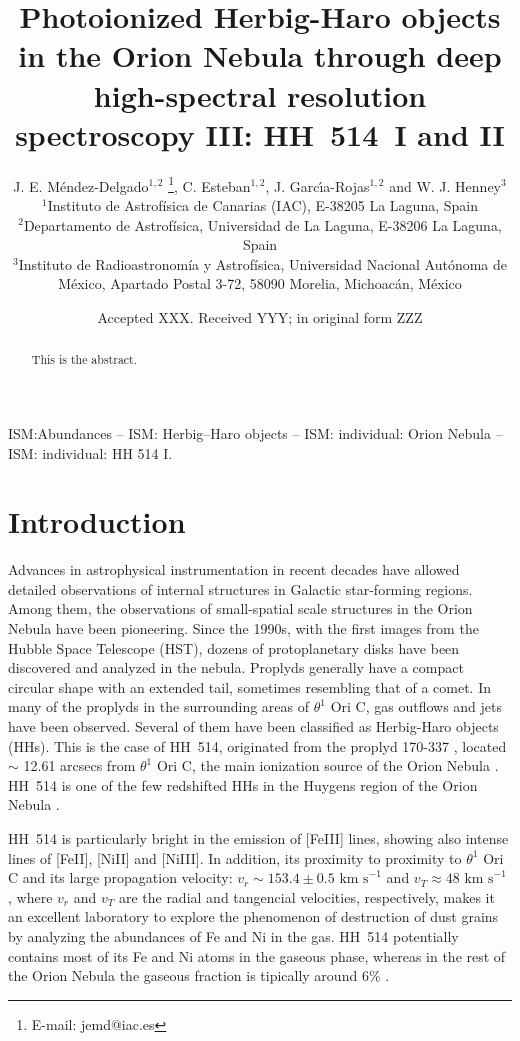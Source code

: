 \documentclass[fleqn,usenatbib]{mnras}
\title[HH~514~I and II in the Orion Nebula]{Photoionized Herbig-Haro objects in the Orion Nebula through deep high-spectral resolution spectroscopy III: HH~514~I and II}
\author[J. E. M\'endez-Delgado et al.]
{J. E. M\'endez-Delgado$^{1,2}$ \thanks{E-mail: jemd@iac.es},
C. Esteban$^{1,2}$, J. Garc{\'{\i}}a-Rojas$^{1,2}$ and W. J. Henney$^{3}$  
\\
$^{1}$Instituto de Astrof\'isica de Canarias (IAC), E-38205 La Laguna, Spain\\
$^{2}$Departamento de Astrof\'isica, Universidad de La Laguna, E-38206 La Laguna, Spain\\
$^{3}$Instituto de Radioastronom\'ia y Astrof\'isica, Universidad Nacional Aut\'onoma de M\'exico, Apartado Postal 3-72, 58090 Morelia, Michoac\'an, M\'exico}
\date{Accepted XXX. Received YYY; in original form ZZZ}
\begin{document}
\label{firstpage}
\pagerange{\pageref{firstpage}--\pageref{lastpage}}
\maketitle

\begin{abstract}
This is the abstract. 
\end{abstract}

\begin{keywords}
ISM:Abundances – ISM: Herbig–Haro objects – ISM: individual:
Orion Nebula – ISM: individual: HH 514 I.
\end{keywords}



\section{Introduction}
\label{sec:introduction}

Advances in astrophysical instrumentation in recent decades have allowed detailed observations of internal structures in Galactic star-forming regions. Among them, the observations of small-spatial scale structures in the Orion Nebula have been pioneering. Since the 1990s, with the first images from the Hubble Space Telescope (HST), dozens of protoplanetary disks \citep[proplyds,][]{Odell1993} have been discovered and analyzed in the nebula. Proplyds generally have a compact circular shape with an extended tail, sometimes resembling that of a comet. In many of the proplyds in the surrounding areas of $\theta^1$ Ori C, gas outflows and jets have been observed. Several of them have been classified as Herbig-Haro objects (HHs). This is the case of HH~514, originated from the proplyd 170-337 \citep[][]{bally00}, located $\sim$ 12.61 arcsecs from $\theta^1$ Ori C, the main ionization source of the Orion Nebula \citep[][]{ODell2017}. HH~514 is one of the few redshifted HHs in the Huygens region of the Orion Nebula \citep[][]{odellyhenney08}.

HH~514 is particularly bright in the emission of [Fe\thinspace III] lines, showing also intense lines of  [Fe\thinspace II], [Ni\thinspace II] and [Ni\thinspace III]. In addition, its proximity to proximity to $\theta^1$ Ori C and its large propagation velocity: $v_{r} \sim 153.4 \pm 0.5  \text{ km s}^{-1}$ and $ v_{T} \approx 48 \text{ km s}^{-1}$ \citep{odellyhenney08}, where $v_{r}$ and $v_{T}$ are the radial and tangencial velocities, respectively, makes it an excellent laboratory to explore the phenomenon of destruction of dust grains by analyzing the abundances of Fe and Ni in the gas. HH~514 potentially contains most of its Fe and Ni atoms in the gaseous phase, whereas in the rest of the Orion Nebula the gaseous fraction is tipically around 6\% \citep[][]{mendez2021-2}.
\end{document}

